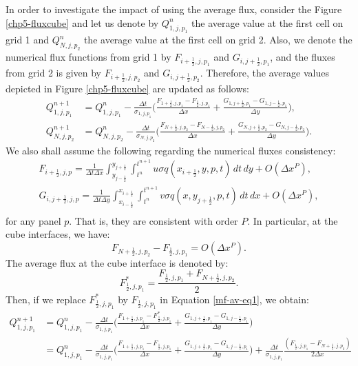In order to investigate the impact of using the average flux, consider the Figure \ref{chp5-fluxcube} and let us
denote by $Q^n_{1,j,p_1}$ the average value at the first cell on grid 1 and
$Q^n_{N,j,p_2}$ the average value at the first cell on grid 2.
Also, we denote the numerical flux functions from grid 1 by $F_{i+\frac{1}{2},j,p_1}$ and $G_{i,j+\frac{1}{2},p_1}$, 
and the fluxes from grid 2 is given by $F_{i+\frac{1}{2},j,p_2}$ and $G_{i,j+\frac{1}{2},p_2}$.
Therefore, the average values depicted in Figure  \ref{chp5-fluxcube} are updated as follows:
\begin{align}
	Q_{1,j,p_1}^{n+1} &= Q_{1,j,p_1}^n - \frac{\Delta t}{\sigma_{1,j,p_1}} \bigg(
	\frac{F_{1+\frac{1}{2},j,p_1}-F_{\frac{1}{2},j,p_1}}{\Delta x}+
	 \frac{G_{1,j+\frac{1}{2},p_1}-G_{1,j-\frac{1}{2},p_1}}{\Delta y} \bigg), \label{mf-av-eq1}\\
	Q_{N,j,p_2}^{n+1} &= Q_{N,j,p_2}^n - \frac{\Delta t}{\sigma_{N,j,p_2}} \bigg(
	\frac{F_{N+\frac{1}{2},j,p_2}-F_{N-\frac{1}{2},j,p_2}}{\Delta x}+
	\frac{G_{N,j+\frac{1}{2},p_2}-G_{N,j-\frac{1}{2},p_2}}{\Delta y} \bigg).
\end{align}
We also shall assume the following regarding the numerical fluxes consistency:
\begin{align*}
	F_{i+\frac{1}{2},j,p} = \frac{1}{\Delta t \Delta x}
	\int_{y_{j-\frac{1}{2}}}^{y_{j+\frac{1}{2}}} \int_{t^n}^{t^{n+1}} u\sigma q (x_{i+\frac{1}{2}},y,p,t)\,dt \,dy + O(\Delta x^P),\\
	G_{i,j+\frac{1}{2},j,p} = \frac{1}{\Delta t \Delta y}
	\int_{x_{i-\frac{1}{2}}}^{x_{i+\frac{1}{2}}} \int_{t^n}^{t^{n+1}} v\sigma q (x,y_{j+\frac{1}{2}},p,t)\,dt \,dx + O(\Delta x^P),\\
\end{align*}
for any panel $p$.
That is, they are consistent with order $P$.
In particular, at the cube interfaces, we have:
\begin{equation}
\label{mf-av-order}
F_{N+\frac{1}{2},j,p_2}-F_{\frac{1}{2},j,p_1} = O(\Delta x^P).
\end{equation}
The average flux at the cube interface is denoted by:
\begin{equation}
 F^{*}_{\frac{1}{2},j,p_1} = \frac{F_{\frac{1}{2},j,p_1}+F_{N+\frac{1}{2},j,p_2}}{2}.
\end{equation}
Then, if we replace $F^{*}_{\frac{1}{2},j,p_1}$ by $F_{\frac{1}{2},j,p_1}$ in Equation \eqref{mf-av-eq1}, we obtain:
\begin{align*}
	Q_{1,j,p_1}^{n+1} &= Q_{1,j,p_1}^n - \frac{\Delta t}{\sigma_{1,j,p_1}} \bigg(
    \frac{F_{1+\frac{1}{2},j,p_1}-F_{\frac{1}{2},j,p_1}^*}{\Delta x}+
    \frac{G_{1,j+\frac{1}{2},p_1}-G_{1,j-\frac{1}{2},p_1}}{\Delta y} \bigg)\\
	&= 
	Q_{1,j,p_1}^n - \frac{\Delta t}{\sigma_{1,j,p_1}} \bigg(
	\frac{F_{1+\frac{1}{2},j,p_1}-F_{\frac{1}{2},j,p_1}}{\Delta x}+
	\frac{G_{1,j+\frac{1}{2},p_1}-G_{1,j-\frac{1}{2},p_1}}{\Delta y} \bigg)
	+\frac{\Delta t}{\sigma_{1,j,p_1}} 
\frac{(F_{\frac{1}{2},j,p_1}-F_{N+\frac{1}{2},j,p_2})}{2\Delta x}
\end{align*}
